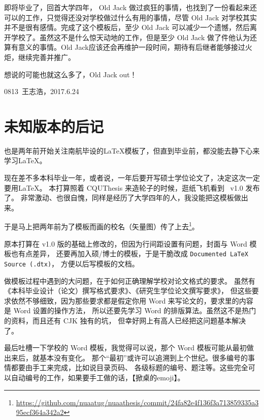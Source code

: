 即将毕业了，回首大学四年， Old Jack 做过疯狂的事情，也找到了一份看起来还可以的工作，只觉得还没对学校做过什么有用的事情，尽管 Old Jack 对学校其实并不是很有感情。完成了这个模板后，至少 Old Jack 可以减少一个遗憾，然后离开学校了。虽然这不是什么惊天动地的工作，但是至少 Old Jack 做了件他认为还算有意义的事情。Old Jack应该还会再维护\nuaathesis 一段时间，期待有后继者能够接过火炬，继续完善并推广\nuaathesis 。

想说的可能也就这么多了，Old Jack out！

\hfill 0813~王志浩，2017.6.24

\section{未知版本的后记}

也是两年前开始关注南航毕设的\LaTeX 模板了，但直到毕业前，都没能去静下心来学习\LaTeX。

现在差不多本科毕业一年，或者说，一年后要开写硕士学位论文了，决定这次一定要用\LaTeX。
本打算照着 CQUThesis 来造轮子的时候，逛纸飞机看到 \nuaathesis~v1.0 发布了。
非常激动、也很自愧，同样是经历了大学四年的人，我没能把这模板做出来。

于是马上把两年前为了模板而画的校名（矢量图）传了上去\footnote{\url{https://github.com/nuaatug/nuaathesis/commit/24fa82e4f136f3a713859335a395ecf364a342a2}}。

原本打算在 v1.0 版的基础上修改的，但因为行间距设置有问题，封面与 Word 模板也有点差异，
还要再加入硕/博士的模板，于是干脆改成 \texttt{Documented LaTeX Source (.dtx)}，
方便以后写模板的文档。

做模板过程中遇到的大问题，在于如何正确理解学校对论文格式的要求。
虽然有《本科毕业设计（论文）撰写格式要求》、《研究生学位论文撰写要求》，
但这些要求依然不够细致，因为那些要求都是假定你用 Word 来写论文的，要求里的内容是 Word 设置的操作方法，
所以还要先学习 Word 的排版算法。虽然这不是热门的资料，而且还有 CJK 独有的坑，
但幸好网上有高人已经把这问题基本解决了。

最后吐槽一下学校的 Word 模板，我觉得可以说，那个 Word 模板可能从最初做出来后，就基本没有变化。
那个“最初”或许可以追溯到上个世纪。很多编号的事情都要由手工来完成，比如说目录页码、
各级标题的编号、题注等。这些完全可以自动编号的工作，如果要手工做的话，【掀桌的emoji】。
